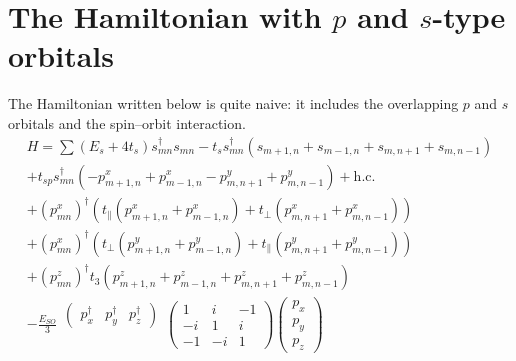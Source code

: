 \documentclass{article}
\begin{document}
\section{The Hamiltonian with $p$ and $s$-type orbitals}
The Hamiltonian written below is quite naive: it includes the overlapping $p$ and $s$ orbitals
and the spin--orbit interaction.
\begin{multline}
   H  = \sum (E_s + 4t_s) s_{mn}^{\dagger} s_{mn} - t_s s_{mn}^{\dagger}
                          (s_{m+1,n} + s_{m-1,n} + s_{m,n+1} + s_{m,n-1}) \\
          + t_{sp} s_{mn}^{\dagger} (-p_{m+1,n}^x + p_{m-1,n}^x - p^y_{m,n+1} + p^y_{m,n-1})
                                                                + \mathrm{h.c.}  \\
          + (p_{mn}^x)^{\dagger}(t_{\parallel}(p_{m+1,n}^x + p_{m-1,n}^x) +
                                 t_{\perp} (p^x_{m,n+1} + p^x_{m,n-1})) \\
          + (p_{mn}^x)^{\dagger}(t_{\perp}(p_{m+1,n}^y + p_{m-1,n}^y) +
                                 t_{\parallel} (p^y_{m,n+1} + p^y_{m,n-1})) \\
          + (p_{mn}^z)^{\dagger} t_3 (p_{m+1,n}^z + p_{m-1,n}^z +
                                p^z_{m,n+1} + p^z_{m,n-1}) \\
          -\frac{E_{SO}}{3}
                \begin{matrix}
                    \left(\begin{matrix}
                        p_x^\dagger & p_y^\dagger & p_z^\dagger
                    \end{matrix}\right) \\
                    \\
                    \\
                \end{matrix}
        		\left(\begin{matrix}
        			1 & i & -1 \\
        			-i & 1 & i \\
        			-1 & -i & 1
        		\end{matrix} \right)
                \left(\begin{matrix}
                    p_x \\ 
                    p_y \\
                    p_z
                \end{matrix}\right)
\end{multline}
\end{document}
